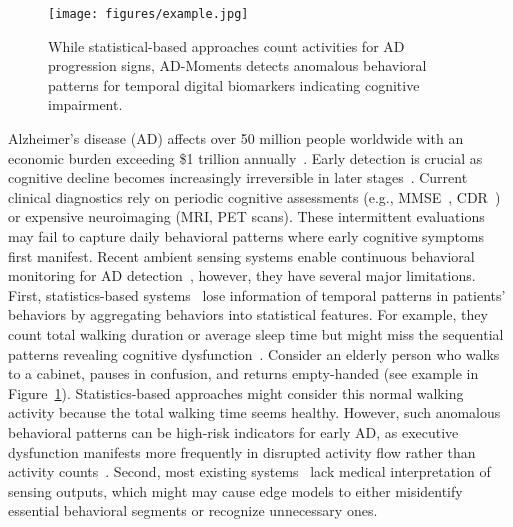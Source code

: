 \documentclass[sigconf, anonymous, 9pt, nonacm]{acmart}
\newcommand{\sys}{AD-Moments\xspace}
\begin{document}
\begin{figure}[t]
\centering
\texttt{[image: figures/example.jpg]}
\caption{While statistical-based approaches count activities for AD progression signs, \sys detects anomalous behavioral patterns for temporal digital biomarkers indicating cognitive impairment.}
\label{fig:example}
\vspace{-2.1em}
\end{figure}

Alzheimer's disease (AD) affects over 50 million people worldwide with an economic burden exceeding \$1 trillion annually~\cite{WHO2024,ADI2024}. Early detection is crucial as cognitive decline becomes increasingly irreversible in later stages~\cite{Rasmussen2019EarlyDiagnosis,Porsteinsson2021Diagnosis}. Current clinical diagnostics rely on periodic cognitive assessments (e.g., MMSE~\cite{Folstein1975_MMSE}, CDR~\cite{Hughes1982_CDR}) or expensive neuroimaging (MRI, PET scans).
These intermittent evaluations may fail to capture daily behavioral patterns where early cognitive symptoms first manifest.
Recent ambient sensing systems enable continuous behavioral monitoring for AD detection~\cite{Boyle2025Activity}, however, they have several major limitations. First, 
statistics-based systems~\cite{ouyang2024ADMarker} lose  information of temporal patterns in patients' behaviors by aggregating behaviors into statistical features.
For example, they count total walking duration or average sleep time but might miss the sequential patterns revealing cognitive dysfunction~\cite{Grammatikopoulou2024SmartHomeAD}. Consider an elderly person who walks to a cabinet, pauses in confusion, and returns empty-handed (see example in Figure~\ref{fig:example}). 
Statistics-based approaches might consider this normal walking activity because the total walking time seems healthy. 
However, such anomalous behavioral patterns can be high-risk indicators for early AD, as executive dysfunction manifests more frequently in disrupted activity flow rather than activity counts~\cite{Rasmussen2019EarlyDiagnosis,kirova2015working,guarino2019executive}. 
Second, most existing systems~\cite{Civitarese2025SERENADE} lack medical interpretation of sensing outputs, which might may cause edge models to either misidentify essential behavioral segments or recognize unnecessary ones.
\end{document}
